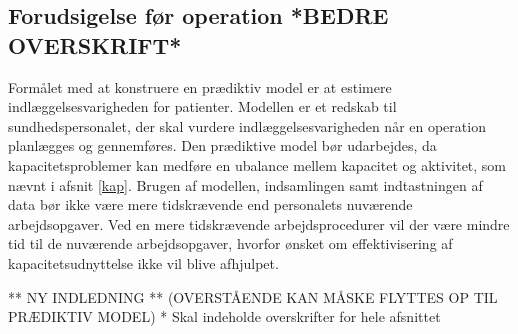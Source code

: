 \subsection{Forudsigelse før operation *BEDRE OVERSKRIFT*} 
Formålet med at konstruere en prædiktiv model er at estimere indlæggelsesvarigheden for patienter. Modellen er et redskab til sundhedspersonalet, der skal vurdere indlæggelsesvarigheden når en operation planlægges og gennemføres. Den prædiktive model bør udarbejdes, da kapacitetsproblemer kan medføre en ubalance mellem kapacitet og aktivitet, som nævnt i afsnit \ref{kap}. Brugen af modellen, indsamlingen samt indtastningen af data bør ikke være mere tidskrævende end personalets nuværende arbejdsopgaver. Ved en mere tidskrævende arbejdsprocedurer vil der være mindre tid til de nuværende arbejdsopgaver, hvorfor ønsket om effektivisering af kapacitetsudnyttelse ikke vil blive afhjulpet.

** NY INDLEDNING **  (OVERSTÅENDE KAN MÅSKE FLYTTES OP TIL PRÆDIKTIV MODEL)
* Skal indeholde overskrifter for hele afsnittet





